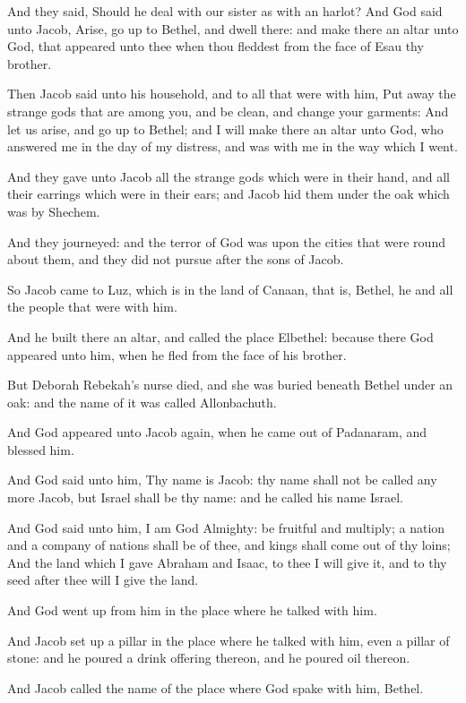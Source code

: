 \Verse And they said, Should he deal with our sister as with an harlot? \Chapter \Verse And God said unto Jacob, Arise, go up to Bethel, and dwell there: and make there an altar unto God, that appeared unto thee when thou fleddest from the face of Esau thy brother.

\Verse Then Jacob said unto his household, and to all that were with him, Put away the strange gods that are among you, and be clean, and change your garments: \Verse And let us arise, and go up to Bethel; and I will make there an altar unto God, who answered me in the day of my distress, and was with me in the way which I went.

\Verse And they gave unto Jacob all the strange gods which were in their hand, and all their earrings which were in their ears; and Jacob hid them under the oak which was by Shechem.

\Verse And they journeyed: and the terror of God was upon the cities that were round about them, and they did not pursue after the sons of Jacob.

\Verse So Jacob came to Luz, which is in the land of Canaan, that is, Bethel, he and all the people that were with him.

\Verse And he built there an altar, and called the place Elbethel: because there God appeared unto him, when he fled from the face of his brother.

\Verse But Deborah Rebekah's nurse died, and she was buried beneath Bethel under an oak: and the name of it was called Allonbachuth.

\Verse And God appeared unto Jacob again, when he came out of Padanaram, and blessed him.

\Verse And God said unto him, Thy name is Jacob: thy name shall not be called any more Jacob, but Israel shall be thy name: and he called his name Israel.

\Verse And God said unto him, I am God Almighty: be fruitful and multiply; a nation and a company of nations shall be of thee, and kings shall come out of thy loins; \Verse And the land which I gave Abraham and Isaac, to thee I will give it, and to thy seed after thee will I give the land.

\Verse And God went up from him in the place where he talked with him.

\Verse And Jacob set up a pillar in the place where he talked with him, even a pillar of stone: and he poured a drink offering thereon, and he poured oil thereon.

\Verse And Jacob called the name of the place where God spake with him, Bethel.

